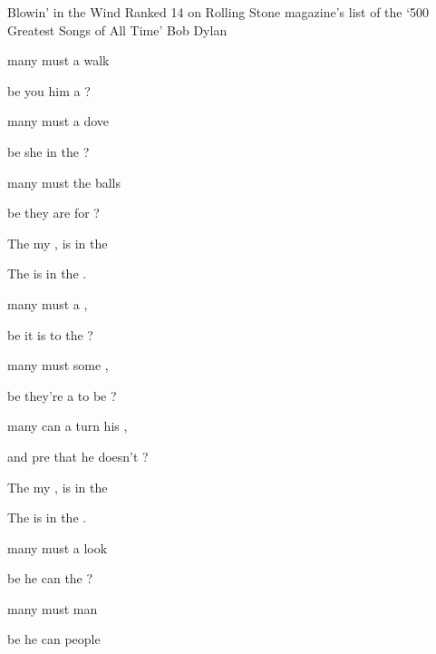 \begin{SBSong}{Blowin' in the Wind}
  {Ranked 14 on Rolling Stone magazine's list of the `500 Greatest Songs of All Time'}
  {Bob Dylan}
  \begin{SBVerse}
     many  must a  walk  

    be you  him a ?

     many  must a  dove  

    be she  in the ?

     many  must the  balls 

    be they are for ?

    The  my , is  in the 

    The  is  in the .
  \end{SBVerse}
  \begin{SBVerse}
     many  must a  , 

    be it is  to the ?

     many  must some  , 

    be they're a to be ?
    
     many  can a  turn his , 

    and pre that he  doesn't ?  

    The  my , is  in the 

    The  is  in the .
  \end{SBVerse}
  \CBPageBrk
  \begin{SBVerse}
     many  must a  look 

    be he can  the ?

     many  must  man 

    be he can  people 


\end{SBVerse}
\end{SBSong}
